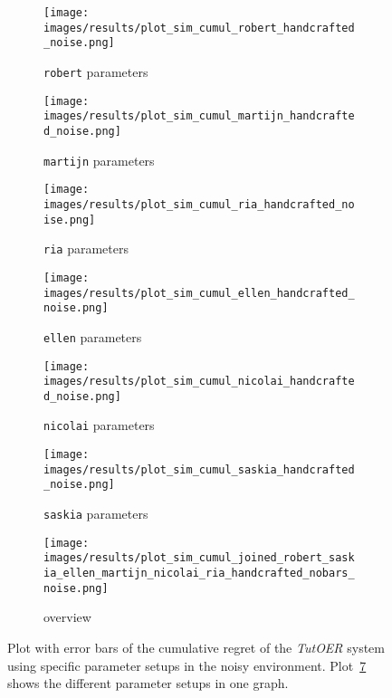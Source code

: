 
\begin{figure}[ht]
	\begin{subfigure}{0.48\linewidth}
	\texttt{[image: images/results/plot\_sim\_cumul\_robert\_handcrafted\_noise.png]}
	\caption{\texttt{robert} parameters}
	\label{fig:cumul_handcrafted_noise_robert}
	\end{subfigure}
	\hfill
	\begin{subfigure}{0.48\linewidth}
	\texttt{[image: images/results/plot\_sim\_cumul\_martijn\_handcrafted\_noise.png]}
	\caption{\texttt{martijn} parameters}
	\label{fig:cumul_handcrafted_noise_martijn}
	\end{subfigure}
	\begin{subfigure}{0.48\linewidth}
	\texttt{[image: images/results/plot\_sim\_cumul\_ria\_handcrafted\_noise.png]}
	\caption{\texttt{ria} parameters}
	\label{fig:cumul_handcrafted_noise_ria}
	\end{subfigure}
	\hfill
	\begin{subfigure}{0.48\linewidth}
	\texttt{[image: images/results/plot\_sim\_cumul\_ellen\_handcrafted\_noise.png]}
	\caption{\texttt{ellen} parameters}
	\label{fig:cumul_handcrafted_noise_ellen}
	\end{subfigure}
	\begin{subfigure}{0.48\linewidth}
	\texttt{[image: images/results/plot\_sim\_cumul\_nicolai\_handcrafted\_noise.png]}
	\caption{\texttt{nicolai} parameters}
	\label{fig:cumul_handcrafted_noise_nicolai}
	\end{subfigure}
	\hfill
	\begin{subfigure}{0.48\linewidth}
	\texttt{[image: images/results/plot\_sim\_cumul\_saskia\_handcrafted\_noise.png]}
	\caption{\texttt{saskia} parameters}
	\label{fig:cumul_handcrafted_noise_saskia}
	\end{subfigure}
	\begin{subfigure}{\linewidth}
	\texttt{[image: images/results/plot\_sim\_cumul\_joined\_robert\_saskia\_ellen\_martijn\_nicolai\_ria\_handcrafted\_nobars\_noise.png]}
	\caption{overview}
	\label{fig:cumul_handcrafted_noise_overview_group2}
	\end{subfigure}
	\caption[Cumulative regret in noisy simulated environment for group 2]{Plot with error bars of the cumulative regret of the \emph{TutOER}
	system using specific parameter setups in the noisy environment.
	Plot~\ref{fig:cumul_handcrafted_noise_overview_group2} shows the
	different parameter setups in one graph.}
	\label{fig:cumul_handcrafted_noise_container_group2}
\end{figure}

